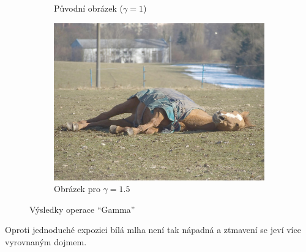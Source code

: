 \documentclass[11pt, a4paper, titlepage]{article}
\renewcommand{\uv}[1]{``#1''}
\begin{document}
\begin{figure}[h]
\begin{subfigure}[t]{0.25\textwidth}
        \caption{Původní obrázek ($\gamma = 1$)}
    \end{subfigure}
    \hspace{1cm}
    \begin{subfigure}[t]{0.25\textwidth}
        \vskip 0pt
        \includegraphics[width=1.0\textwidth]{horse_gamma_plus.jpg}
        \caption{Obrázek pro $\gamma = 1.5$}
    \end{subfigure}
    \caption{Výsledky operace \uv{Gamma}}
    \label{fig:gamma}
\end{figure}
Oproti jednoduché expozici bílá mlha není tak nápadná a ztmavení se jeví více vyrovnaným dojmem.
\end{document}
